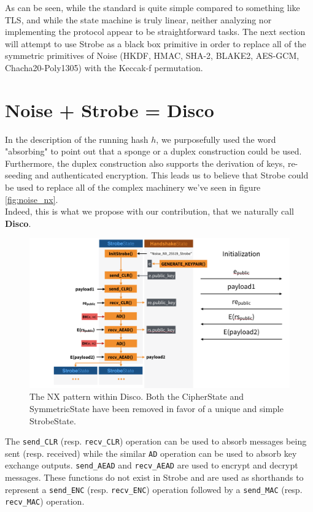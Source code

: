 \documentclass{article}
\begin{document}
As can be seen, while the standard is quite simple compared to something like TLS, and while the state machine is truly linear, neither analyzing nor implementing the protocol appear to be straightforward tasks. The next section will attempt to use Strobe as a black box primitive in order to replace all of the symmetric primitives of Noise (HKDF, HMAC, SHA-2, BLAKE2, AES-GCM, Chacha20-Poly1305) with the Keccak-f permutation.

\section{Noise + Strobe = Disco}

In the description of the running hash $h$, we purposefully used the word "absorbing" to point out that a sponge or a duplex construction could be used. Furthermore, the duplex construction also supports the derivation of keys, re-seeding and authenticated encryption. This leads us to believe that Strobe could be used to replace all of the complex machinery we've seen in figure \ref{fig:noise_nx}.\\

Indeed, this is what we propose with our contribution, that we naturally call \textbf{Disco}.

\begin{figure}[H]
\centering
\includegraphics[width=\textwidth]{rwcimg/disco_NX.png}
\caption{The NX pattern within Disco. Both the CipherState and SymmetricState have been removed in favor of a unique and simple StrobeState.}
\end{figure}

The \texttt{send_CLR} (resp. \texttt{recv_CLR}) operation can be used to absorb messages being sent (resp. received) while the similar \texttt{AD} operation can be used to absorb key exchange outputs. \texttt{send_AEAD} and \texttt{recv_AEAD} are used to encrypt and decrypt messages. These functions do not exist in Strobe and are used as shorthands to represent a \texttt{send_ENC} (resp. \texttt{recv_ENC}) operation followed by a \texttt{send_MAC} (resp. \texttt{recv_MAC}) operation.\\
\end{document}
